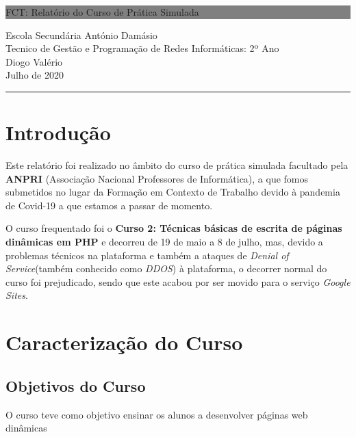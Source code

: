 \documentclass[12pt]{article}
\begin{document}
\begin{titlepage}

	\colorbox{grey}{
		\parbox[t]{0.93\textwidth}{ %
			\parbox[t]{0.91\textwidth}{ %
				\raggedleft
				\fontsize{60pt}{70pt}\selectfont
				\vspace{0.5cm}

				FCT: Relatório do Curso de Prática Simulada\\


				\vspace{0.5cm}
			}
		}
	}
	\vfill

	\parbox[t]{0.93\textwidth}{
		\raggedleft
		\large
		{\Large
   	Escola Secundária António Damásio\\[4pt]
    \large Tecnico de Gestão e Programação de Redes Informáticas: 2º Ano\\[2pt]
    \Large Diogo Valério}\\[4pt]
    Julho de 2020\\[1pt]
		\hfill\rule{0.6\linewidth}{1pt}
	}
\end{titlepage}


\tableofcontents
\newpage

\section{Introdução}
Este relatório foi realizado no âmbito do curso de prática simulada facultado pela \textbf{ANPRI} (Associação Nacional Professores de Informática), a que fomos submetidos no lugar da Formação em Contexto de Trabalho devido à pandemia de Covid-19 a que estamos a passar de momento.

O curso frequentado foi o \textbf{Curso 2: Técnicas básicas de escrita de páginas dinâmicas em PHP} e decorreu de 19 de maio a 8 de julho, mas, devido a problemas técnicos na plataforma e também a ataques de  \textit{Denial of Service}(também conhecido como \textit{DDOS}) à plataforma, o decorrer normal do curso foi prejudicado, sendo que este acabou por ser movido para o serviço \textit{Google Sites}.


\section{Caracterização do Curso}
\subsection{Objetivos do Curso}
O curso teve como objetivo ensinar os alunos a desenvolver páginas web dinâmicas
\end{document}
